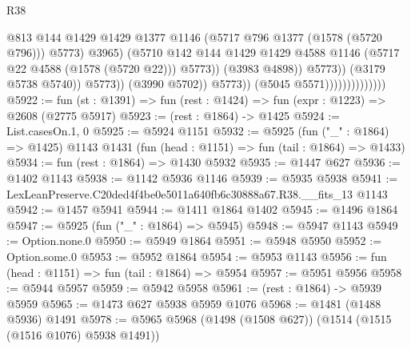 \begin{lexlean}{R38}
\begin{coremodule}
                                                      @813
                                                      @144
                                                      @1429
                                                      @1429
                                                      @1377
                                                      @1146
                                                      (@5717 @796 @1377 (@1578 (@5720 @796)))
                                                      @5773)
                                                    @3965)
                                                  (@5710
                                                    @142
                                                    @144
                                                    @1429
                                                    @1429
                                                    @4588
                                                    @1146
                                                    (@5717 @22 @4588 (@1578 (@5720 @22)))
                                                    @5773))
                                                (@3983 @4898))
                                              @5773))
                                          (@3179 @5738 @5740))
                                        @5773))
                                    (@3990 @5702))
                                  @5773))
                              (@5045 @5571))))))))))))))
@5922 := fun (st : @1391) => fun (rest : @1424) => fun (expr : @1223) => @2608 (@2775 @5917)
@5923 := (rest : @1864) -> @1425
@5924 := List.casesOn.{1, 0}
@5925 := @5924 @1151
@5932 := @5925
    (fun ("_" : @1864) => @1425)
    @1143
    @1431
    (fun (head : @1151) => fun (tail : @1864) => @1433)
@5934 := fun (rest : @1864) => @1430 @5932
@5935 := @1447 @627
@5936 := @1402 @1143
@5938 := @1142 @5936 @1146
@5939 := @5935 @5938
@5941 := LexLeanPreserve.C20ded4f4be0e5011a640fb6c30888a67.R38.__fits_13 @1143
@5942 := @1457 @5941
@5944 := @1411 @1864 @1402
@5945 := @1496 @1864
@5947 := @5925 (fun ("_" : @1864) => @5945)
@5948 := @5947 @1143
@5949 := Option.none.{0}
@5950 := @5949 @1864
@5951 := @5948 @5950
@5952 := Option.some.{0}
@5953 := @5952 @1864
@5954 := @5953 @1143
@5956 := fun (head : @1151) => fun (tail : @1864) => @5954
@5957 := @5951 @5956
@5958 := @5944 @5957
@5959 := @5942 @5958
@5961 := (rest : @1864) -> @5939 @5959
@5965 := @1473 @627 @5938 @5959 @1076
@5968 := @1481 (@1488 @5936) @1491
@5978 := @5965 @5968 (@1498 (@1508 @627)) (@1514 (@1515 (@1516 @1076) @5938 @1491))

\end{coremodule}
\end{lexlean}
